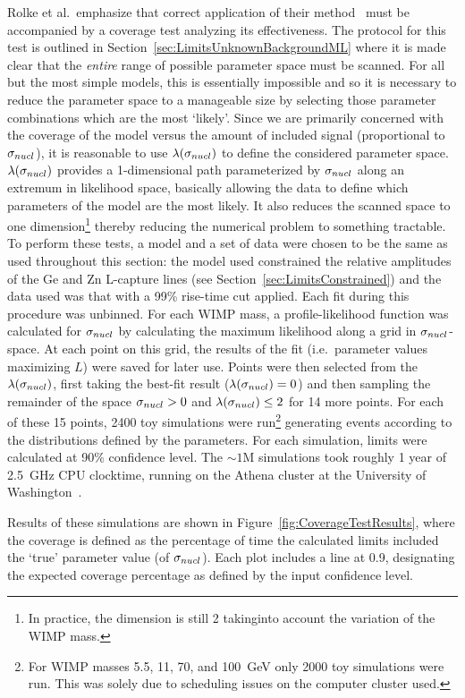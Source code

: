 Rolke et al.~emphasize that correct application of their method~\cite{Rol05} must be accompanied by a coverage test analyzing its effectiveness.  The protocol for this test is outlined in Section~\ref{sec:LimitsUnknownBackgroundML} where it is made clear that the \emph{entire} range of possible parameter space must be scanned.  For all but the most simple models, this is essentially impossible and so it is necessary to reduce the parameter space to a manageable size by selecting those parameter combinations which are the most `likely'.  Since we are primarily concerned with the coverage of the model versus the amount of included signal (proportional to $\sigma_{nucl}$), it is reasonable to use $\lambda(\sigma_{nucl})$ to define the considered parameter space.  $\lambda(\sigma_{nucl})$ provides a 1-dimensional path parameterized by $\sigma_{nucl}$ along an extremum in likelihood space, basically allowing the data to define which parameters of the model are the most likely.  It also reduces the scanned space to one dimension\footnote{In practice, the dimension is still 2 takinginto account the variation of the WIMP mass.} thereby reducing the numerical problem to something tractable.  
To perform these tests, a model and a set of data were chosen to be the same as used throughout this section: the model used constrained the relative amplitudes of the Ge and Zn L-capture lines (see Section~\ref{sec:LimitsConstrained}) and the data used was that with a 99\% rise-time cut applied.  Each fit during this procedure was unbinned.  For each WIMP mass, a profile-likelihood function was calculated for $\sigma_{nucl}$ by calculating the maximum likelihood along a grid in $\sigma_{nucl}$-space.  At each point on this grid, the results of the fit (i.e.~parameter values maximizing $L$) were saved for later use.  Points were then selected from the $\lambda(\sigma_{nucl})$, first taking the best-fit result ($\lambda(\sigma_{nucl}) = 0$) and then sampling the remainder of the space $\sigma_{nucl} > 0$ and $\lambda(\sigma_{nucl}) \leq 2$ for 14 more points.  For each of these 15 points, 2400 toy simulations were run\footnote{For WIMP masses 5.5, 11, 70, and 100~GeV only 2000 toy simulations were run.  This was solely due to scheduling issues on the computer cluster used.} generating events according to the distributions defined by the parameters.  For each simulation, limits were calculated at 90\% confidence level.  The $\sim1$M simulations took roughly 1 year of 2.5~GHz CPU clocktime, running on the Athena cluster at the University of Washington~\cite{Athena}.  

Results of these simulations are shown in Figure~\ref{fig:CoverageTestResults}, where the coverage is defined as the percentage of time the calculated limits included the `true' parameter value (of $\sigma_{nucl}$).  Each plot includes a line at 0.9, designating the expected coverage percentage as defined by the input confidence level.  

